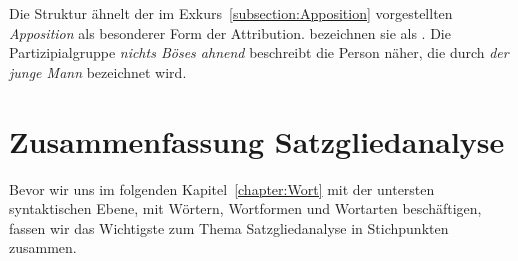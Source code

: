 Die Struktur ähnelt der im Exkurs~\ref{subsection:Apposition} vorgestellten \textit{Apposition} als besonderer Form der Attribution. \citet[2217]{ZifHoffStr1997} bezeichnen sie als . Die Partizipialgruppe \textit{nichts Böses ahnend} beschreibt die Person näher, die durch \textit{der junge Mann} bezeichnet wird. 


\section{Zusammenfassung Satzgliedanalyse}\label{section:Zfsg_Satzgliedanalyse}

Bevor wir uns im folgenden Kapitel~\ref{chapter:Wort} mit der untersten syntaktischen Ebene, mit Wörtern, Wortformen und Wortarten beschäftigen, fassen wir das Wichtigste zum Thema Satzgliedanalyse in Stichpunkten zusammen. 

